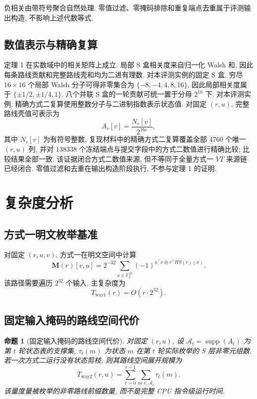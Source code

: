 \documentclass[UTF8,a4paper,zihao=-4,fontset=fandol]{ctexart}
\numberwithin{equation}{section}
\theoremstyle{definition}
\theoremstyle{plain}
\newtheorem{proposition}[theorem]{命题}
\theoremstyle{remark}
\newcommand{\supp}{\operatorname{supp}}
\begin{document}
负相关由带符号聚合自然处理. 零值过滤、零掩码排除和重复端点去重属于评测输出构造, 不影响上述代数等式.

\subsection{数值表示与精确复算}

定理 1 在实数域中的相关矩阵上成立. 局部 S 盒相关度来自归一化 Walsh 和, 因此每条路线贡献和完整路线壳和均为二进有理数. 对本评测实例的固定 S 盒, 穷尽 $16\times16$ 个局部 Walsh 分子可得非零集合为 $\{-8,-4,4,8,16\}$, 因此局部相关度属于 $\{\pm 1/2,\pm 1/4,1\}$. 八个并联 S 盒的一轮贡献可统一置于分母 $2^{16}$ 下. 对本评测实例, 精确方式二复算使用整数分子与二进制指数表示状态值. 对固定 $(r,u)$, 完整路线壳值可表示为
\begin{equation}
A_r[v]=\frac{N_r[v]}{2^{16r}},
\label{eq:dyadic-exact-value}
\end{equation}
其中 $N_r[v]$ 为有符号整数. 复现材料中的精确方式二复算覆盖全部 4760 个唯一 $(r,u)$ 列, 并对 138338 个冻结端点与提交字段中的方式二数值进行精确比较; 比较结果全部一致. 该证据闭合方式二数值来源, 但不等同于全量方式一 $VT$ 来源链已经闭合. 零值过滤和去重在输出构造阶段执行, 不参与定理 1 的证明.

\section{复杂度分析}

\subsection{方式一明文枚举基准}

对固定 $(r,u,v)$, 方式一在明文空间中计算
\begin{equation}
\bm{M}(r)[v,u]=2^{-32}\sum_{x\in\mathbb F_2^{32}}(-1)^{u^\top x\oplus v^\top HS(r)(x)}.
\label{eq:way1}
\end{equation}
该路径需要遍历 $2^{32}$ 个输入, 主复杂度为
\begin{equation}
T_{\mathrm{way1}}(r)=O(r\cdot 2^{32}).
\label{eq:way1-complexity}
\end{equation}

\subsection{固定输入掩码的路线空间代价}

\begin{proposition}[固定输入掩码的路线空间代价]
对固定 $(r,u)$, 设 $\mathcal A_t=\supp(A_t)$ 为第 $t$ 轮状态表的支撑集, $\tau_t(m)$ 为状态 $m$ 在第 $t$ 轮实际枚举的 S 层非零元组数. 若一次方式二运行没有状态剪枝, 则其路线空间展开规模为
\begin{equation}
T_{\mathrm{way2}}(r,u)=\sum_{t=0}^{r-1}\sum_{m\in\mathcal A_t}\tau_t(m).
\label{eq:way2-complexity}
\end{equation}
该量度量被枚举的非零路线前缀数量, 而不是完整 CPU 指令级运行时间.
\end{proposition}
\end{document}
